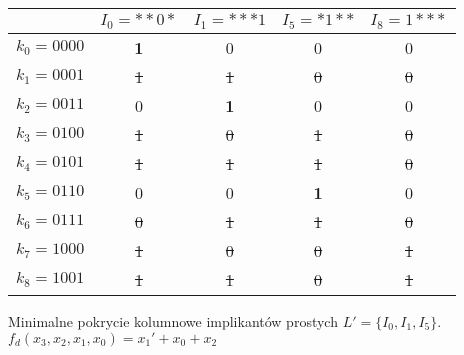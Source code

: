 \begin{table}[H]
    \centering
    \begin{tabular}[t]{ |c||c|c|c|c| }
        \hline
        & $I_0 = {*}{*}0{*}$ & $I_1 = {*}{*}{*}1$ & $I_5 = {*}1{*}{*}$ & $I_8 = 1{*}{*}{*}$ \\
        \hline
        \hline
        $k_0 = 0000$ & \textbf{1} & 0 & 0 & 0 \\
        \hline
        \sout{$k_1 = 0001$} & \sout{1} & \sout{1} & \sout{0} & \sout{0} \\
        \hline
        $k_2 = 0011$ & 0 & \textbf{1} & 0 & 0 \\
        \hline
        \sout{$k_3 = 0100$} & \sout{1} & \sout{0} & \sout{1} & \sout{0} \\
        \hline
        \sout{$k_4 = 0101$} & \sout{1} & \sout{1} & \sout{1} & \sout{0} \\
        \hline
        $k_5 = 0110$ & 0 & 0 & \textbf{1} & 0 \\
        \hline
        \sout{$k_6 = 0111$} & \sout{0} & \sout{1} & \sout{1} & \sout{0} \\
        \hline
        \sout{$k_7 = 1000$} & \sout{1} & \sout{0} & \sout{0} & \sout{1} \\
        \hline
        \sout{$k_8 = 1001$} & \sout{1} & \sout{1} & \sout{0} & \sout{1} \\
        \hline
    \end{tabular}
    \caption{} \label{tab:min-blockc}
\end{table}

Minimalne pokrycie kolumnowe implikantów prostych $L' = \{I_0, I_1, I_5\}$.
$f_d(x_3, x_2, x_1, x_0) = x_1' + x_0 + x_2$